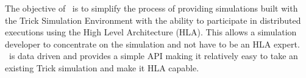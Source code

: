%
%
%
%
%

The objective of \TrickHLA\ is to simplify the process of providing simulations
built with the Trick Simulation Environment\cite{Trick:Documentation} with
the ability to participate in distributed executions using the High Level
Architecture (HLA)\cite{IEEE1516:FRAMEWORK}. This allows a simulation developer
to concentrate on the simulation and not have to be an HLA expert.
\TrickHLA\ is data driven and provides a simple API making it relatively easy
to take an existing Trick simulation and make it HLA capable.
